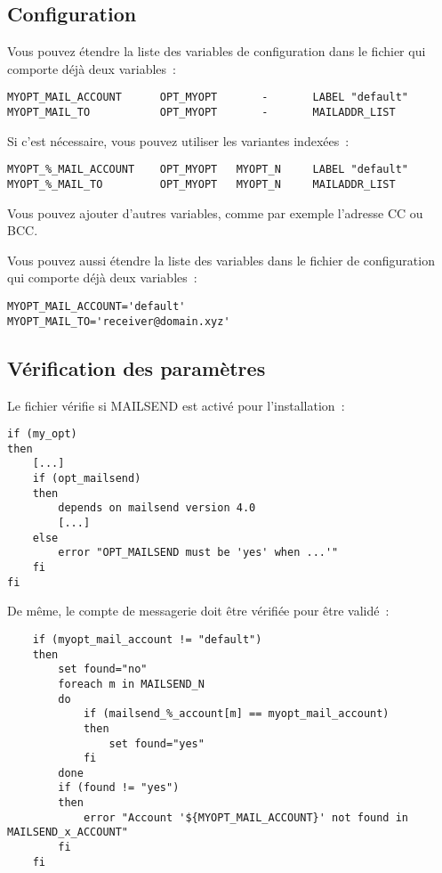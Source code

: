 \subsection{Configuration}
    Vous pouvez étendre la liste des variables de configuration dans
	le fichier  qui comporte déjà deux variables~:

\begin{verbatim}
MYOPT_MAIL_ACCOUNT      OPT_MYOPT       -       LABEL "default"
MYOPT_MAIL_TO           OPT_MYOPT       -       MAILADDR_LIST 
\end{verbatim}

    Si c'est nécessaire, vous pouvez utiliser les variantes indexées~:

\begin{verbatim}
MYOPT_%_MAIL_ACCOUNT    OPT_MYOPT   MYOPT_N     LABEL "default"
MYOPT_%_MAIL_TO         OPT_MYOPT   MYOPT_N     MAILADDR_LIST 
\end{verbatim}

    Vous pouvez ajouter d'autres variables, comme par exemple l'adresse CC ou BCC.

    Vous pouvez aussi étendre la liste des variables dans le fichier de configuration
	 qui comporte déjà deux variables~:

\begin{verbatim}
MYOPT_MAIL_ACCOUNT='default'
MYOPT_MAIL_TO='receiver@domain.xyz' 
\end{verbatim}

\subsection{Vérification des paramètres}
	Le fichier  vérifie si MAILSEND est activé pour
	l'installation~:

\begin{verbatim}
if (my_opt)
then
    [...]
    if (opt_mailsend)
    then
        depends on mailsend version 4.0
        [...]
    else
        error "OPT_MAILSEND must be 'yes' when ...'"
    fi
fi
\end{verbatim}

    De même, le compte de messagerie doit être vérifiée pour être validé~:

\begin{verbatim}
    if (myopt_mail_account != "default")
    then
        set found="no"
        foreach m in MAILSEND_N
        do
            if (mailsend_%_account[m] == myopt_mail_account)
            then
                set found="yes" 
            fi
        done
        if (found != "yes")
        then
            error "Account '${MYOPT_MAIL_ACCOUNT}' not found in MAILSEND_x_ACCOUNT"
        fi
    fi
\end{verbatim}

